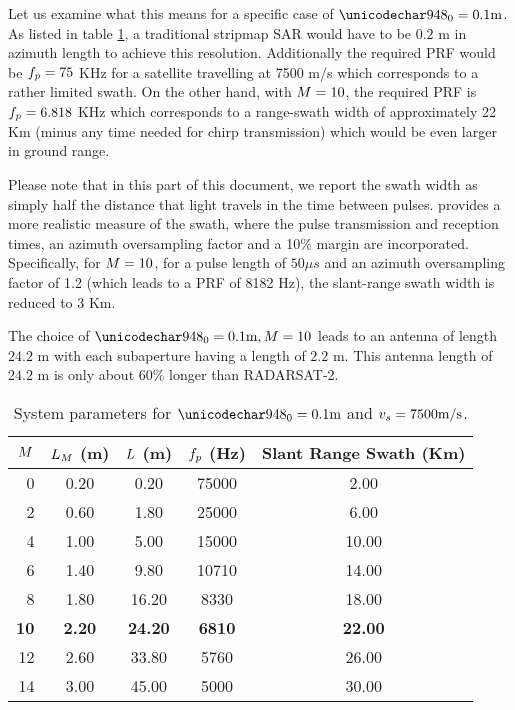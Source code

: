 Let us examine what this means for a specific case of $\resxDesired = 0.1\text{m}$. As listed in table \ref{tb:Simulation}, a traditional stripmap SAR would have to be $0.2$ m in azimuth length to achieve this resolution. Additionally the required PRF would be $f_p = 75$ KHz for a satellite travelling at 7500 m/s which corresponds to a rather limited swath. On the other hand, with $M=10$, the required PRF is $f_p = 6.818$ KHz which corresponds to a range-swath width of approximately 22 Km (minus any time needed for chirp transmission) which would be even larger in ground range. 
\par
Please note that in this part of this document, we report the swath width as simply half the distance that light travels in the time between pulses.  provides a more realistic measure of the swath, where the pulse transmission and reception times, an azimuth oversampling factor and a 10\% margin are incorporated. Specifically, for $M=10$, for a pulse length of $50\mu s$ and an azimuth oversampling factor of 1.2 (which leads to a PRF of 8182 Hz), the slant-range swath width is reduced to 3 Km. 
\par
The choice of $\resxDesired=0.1\text{m}, \channelM=10$ leads to an antenna of length $24.2$ m with each subaperture having a length of $2.2$ m. This antenna length of $24.2$ m is only about $60$\% longer than RADARSAT-2.
\begin{table}[h!]
\begin{center}
\caption{System parameters for $\resxDesired=0.1 \text{m}$ and $v_s=7500 \text{m/s}$.}
\label{tb:Simulation}
 \begin{tabular}{r|c|c|c|c}\\\hline
  {\bf $M$} & {\bf $L_M$ (m)} & {\bf $L$ (m)} & {\bf $f_p$ (Hz)} & {\bf Slant Range Swath (Km)}\\\hline 
0 & 0.20 & 0.20 & 75000 & 2.00\\\hline
2 & 0.60 & 1.80 & 25000 & 6.00\\\hline
4 & 1.00 & 5.00 & 15000 & 10.00\\\hline
6 & 1.40 & 9.80 & 10710 & 14.00\\\hline
8 & 1.80 & 16.20 & 8330 & 18.00\\\hline
{\bf 10} & {\bf 2.20} & {\bf 24.20} & {\bf 6810} & {\bf 22.00}\\\hline
12 & 2.60 & 33.80 & 5760 & 26.00\\\hline
14 & 3.00 & 45.00 & 5000 & 30.00\\\hline
 \end{tabular}
 \end{center}
\end{table}
